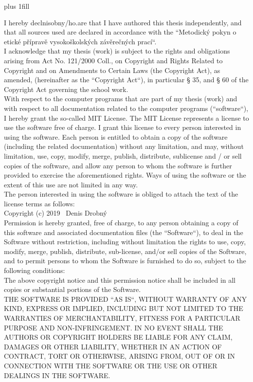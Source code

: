\openright
\hypersetup{pageanchor=true}
\pagestyle{plain}
\vglue 0pt plus 1fill


\noindent

\medskip\noindent
I hereby declnisobny/ho.are that I have authored this thesis independently, and that all sources used are declared in accordance with the ``Metodický pokyn o etické přípravě vysokoškolských závěrečných prací``. \\

I acknowledge that my thesis (work) is subject to the rights and obligations arising from Act No. 121/2000 Coll., on Copyright and Rights Related to Copyright and on Amendments to Certain Laws (the Copyright Act), as amended, (hereinafter as the ``Copyright Act``), in particular § 35, and § 60 of the Copyright Act governing the school work. \\

With respect to the computer programs that are part of my thesis (work) and with respect to all documentation related to the computer programs (``software``), I hereby grant the so-called MIT License. 
The MIT License represents a license to use the software free of charge. I grant this license to every person interested in using the software. Each person is entitled to obtain a copy of the software (including the related documentation) without any limitation, and may, without limitation, use, copy, modify, merge, publish, distribute, sublicense and / or sell copies of the software, and allow any person to whom the software is further provided to exercise the aforementioned rights. Ways of using the software or the extent of this use are not limited in any way. \\ 

The person interested in using the software is obliged to attach the text of the license terms as follows: \\

Copyright (c) 2019 \  Denis Drobný \\
Permission is hereby granted, free of charge, to any person
obtaining a copy of this software and associated documentation
files (the ``Software``), to deal in the Software without
restriction, including without limitation the rights to use,
copy, modify, merge, publish, distribute, sub-license, and/or sell
copies of the Software, and to permit persons to whom the
Software is furnished to do so, subject to the following
conditions: \\
The above copyright notice and this permission notice shall be
included in all copies or substantial portions of the Software. \\
THE SOFTWARE IS PROVIDED ``AS IS``, WITHOUT WARRANTY OF ANY KIND,
EXPRESS OR IMPLIED, INCLUDING BUT NOT LIMITED TO THE WARRANTIES
OF MERCHANTABILITY, FITNESS FOR A PARTICULAR PURPOSE AND
NON-INFRINGEMENT. IN NO EVENT SHALL THE AUTHORS OR COPYRIGHT
HOLDERS BE LIABLE FOR ANY CLAIM, DAMAGES OR OTHER LIABILITY,
WHETHER IN AN ACTION OF CONTRACT, TORT OR OTHERWISE, ARISING
FROM, OUT OF OR IN CONNECTION WITH THE SOFTWARE OR THE USE OR
OTHER DEALINGS IN THE SOFTWARE. \\

